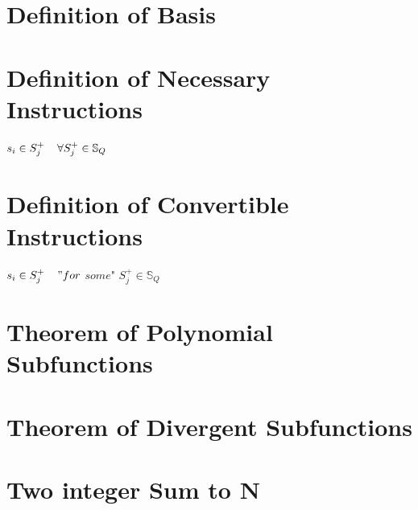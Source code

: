 \documentclass[11pt]{article}
\begin{document}
\section{Definition of Basis}
\section{Definition of Necessary Instructions}
\begin{center}
$
s_i \in S^+_j \hspace{4mm} \forall S^+_j \in \mathbb{S}_Q
$
\end{center}
\section{Definition of Convertible Instructions}
\begin{center}
$
s_i \in S^+_j \hspace{4mm} "for$ $some$" $S^+_j \in \mathbb{S}_Q
$
\end{center}

\newpage
\section{Theorem of Polynomial Subfunctions}
\section{Theorem of Divergent Subfunctions}



\newpage
\section{Two integer Sum to N}
\end{document}
